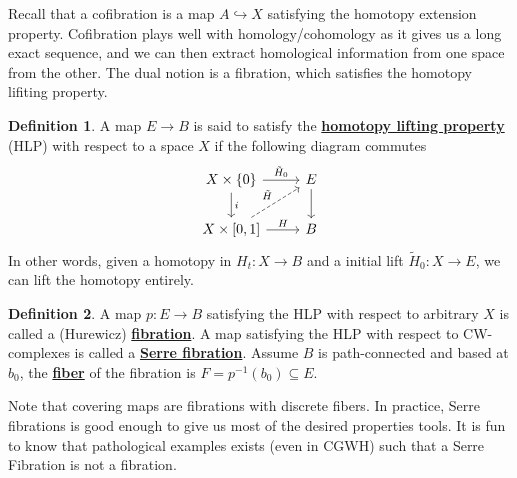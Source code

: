 \documentclass{article}
\theoremstyle{definition}
\theoremstyle{definition}
\theoremstyle{definition}
\theoremstyle{definition}
\theoremstyle{definition}
\newtheorem{definition}{Definition}[section]
\theoremstyle{definition}
\theoremstyle{definition}
\begin{document}
Recall that a cofibration is a map $A\hookrightarrow X$ satisfying the homotopy extension property. Cofibration plays well with homology/cohomology as it gives us a long exact sequence, and we can then extract homological information from one space from the other. The dual notion is a fibration, which satisfies the homotopy lifiting property.

\begin{tcolorbox}[colback=purple!5!white,colframe=purple!75!black]
\begin{definition}
A map $E\to B$ is said to satisfy the \underline{\textbf{homotopy lifting property}} (HLP) with respect to a space $X$ if the following diagram commutes
\[
\begin{tikzcd}
X\times \{0\}\arrow[r,"\tilde{H}_0"]\arrow[d,"i"]&E\arrow[d]\\
X\times [0,1]\arrow[r,"H"]\arrow[ur,dashed,"\tilde{H}"]&B
\end{tikzcd}    
\]
In other words, given a homotopy in $H_t: X\to B$ and a initial lift $\tilde{H}_0: X\to E$, we can lift the homotopy entirely.
\end{definition}
\end{tcolorbox}

\begin{tcolorbox}[colback=purple!5!white,colframe=purple!75!black]
\begin{definition}
A map $p:E\to B$ satisfying the HLP with respect to arbitrary $X$ is called a (Hurewicz)  \underline{\textbf{fibration}}. A map satisfying the HLP with respect to CW-complexes is called a \underline{\textbf{Serre fibration}}. Assume $B$ is path-connected and based at $b_0$, the \underline{\textbf{fiber}} of the fibration is $F=p^{-1}(b_0)\subseteq E$.
\end{definition}
\end{tcolorbox}
Note that covering maps are fibrations with discrete fibers. In practice, Serre fibrations is good enough to give us most of the desired properties tools. It is fun to know that pathological examples exists (even in CGWH) such that a Serre Fibration is not a fibration. 
\end{document}
